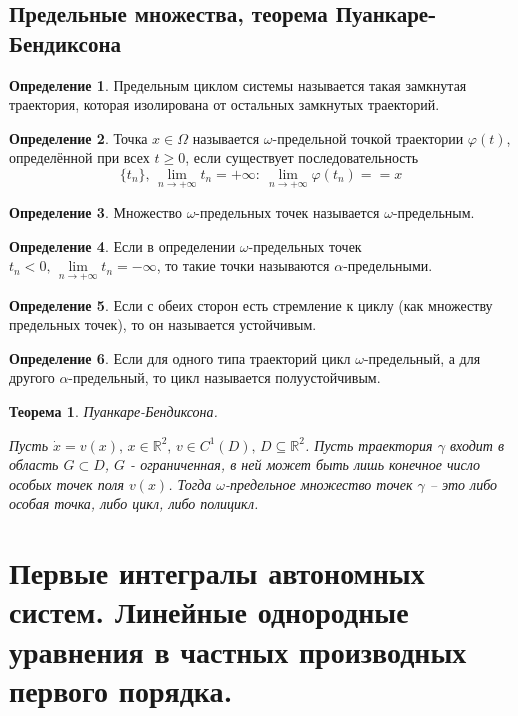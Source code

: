 \documentclass[a4paper,12pt]{article}
\renewcommand{\phi}{\ensuremath{\varphi}}
\renewcommand{\geq}{\ensuremath{\geqslant}}
\theoremstyle{plain}
\newtheorem{theorem}{Теорема}[section]
\theoremstyle{definition}
\newtheorem{definition}{Определение}[section]
\theoremstyle{remark}
\begin{document}
\subsection{Предельные множества, теорема Пуанкаре-Бендиксона}
\begin{definition}
	Предельным циклом системы называется такая замкнутая траектория, которая изолирована от остальных замкнутых траекторий.
\end{definition}

\begin{definition}
	Точка $x \in \Omega$ называется $\omega$-предельной точкой траектории $\phi(t)$, определённой при всех $t \geq 0$, если существует последовательность
	\[\{t_n\},\, \lim_{n \to +\infty} t_n = +\infty:\: \lim_{n \to +\infty} \phi(t_n) = =x\]
\end{definition}

\begin{definition}
	Множество $\omega$-предельных точек называется $\omega$-предельным.
\end{definition}

\begin{definition}
	Если в определении $\omega$-предельных точек $t_n < 0,\, \lim\limits_{n \to +\infty} t_n = -\infty$, то такие точки называются $\alpha$-предельными.
\end{definition}

\begin{definition}
	Если с обеих сторон есть стремление к циклу (как множеству предельных точек), то он называется устойчивым.
\end{definition}

\begin{definition}
	Если для одного типа траекторий цикл $\omega$-предельный, а для другого $\alpha$-предельный, то цикл называется полуустойчивым.
\end{definition}

\begin{theorem}
	Пуанкаре-Бендиксона.

	Пусть $\dot{x} = v(x),\, x \in \mathbb{R}^2,\, v \in C^1(D),\, D \subseteq \mathbb{R}^2$. Пусть траектория $\gamma$ входит в область $G \subset D$, $G$ - ограниченная, в ней может быть лишь конечное число особых точек поля $v(x)$. Тогда $\omega$-предельное множество точек $\gamma$ -- это либо особая точка, либо цикл, либо полицикл.
\end{theorem}

\section{Первые интегралы автономных систем. Линейные однородные уравнения в частных производных первого порядка.}
\end{document}
